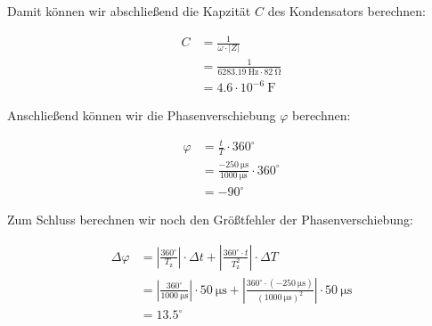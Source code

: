             Damit können wir abschließend die Kapzität $C$ des Kondensators berechnen:

            \begin{equation}
                \begin{aligned}
                    C &= \frac{1}{\omega \cdot |Z|}\\
                      &= \frac{1}{6283.19\ \mathrm{Hz} \cdot 82\ \mathrm{\Omega}}\\
                      &= 4.6 \cdot 10^{-6}\ \mathrm{F}
                \end{aligned}
                \label{eq:Versuch2_Kondensator_Kapazität}
            \end{equation}

            Anschließend können wir die Phasenverschiebung $\varphi$ berechnen:

            \begin{equation}
                \begin{aligned}
                    \varphi &= \frac{t}{T} \cdot 360^{\circ}\\
                         &= \frac{-250\ \mathrm{\mu s}}{1000\ \mathrm{\mu s}} \cdot 360^{\circ}\\
                         &= -90^{\circ}
                \end{aligned}
                \label{eq:Versuch2_Kondensator_Phasenverschiebung}
            \end{equation}

            Zum Schluss berechnen wir noch den Größtfehler der Phasenverschiebung:

            \begin{equation}
                \begin{aligned}
                    \Delta \varphi &= \left|\frac{360^{\circ}}{T_{\mathrm{z}}}\right| \cdot \Delta t + \left|\frac{360^{\circ} \cdot t}{T_{\mathrm{z}}^{2}}\right| \cdot \Delta T\\
                                   &= \left|\frac{360^{\circ}}{1000\ \mathrm{\mu s}}\right| \cdot 50\ \mathrm{\mu s} + \left|\frac{360^{\circ} \cdot (-250\ \mathrm{\mu s})}{(1000\ \mathrm{\mu s})^{2}}\right| \cdot 50\ \mathrm{\mu s}\\
                                   &= 13.5^{\circ}
                \end{aligned}
                \label{eq:Versuch2_Kondensator_Phasenverschiebung_Fehler}
            \end{equation}

